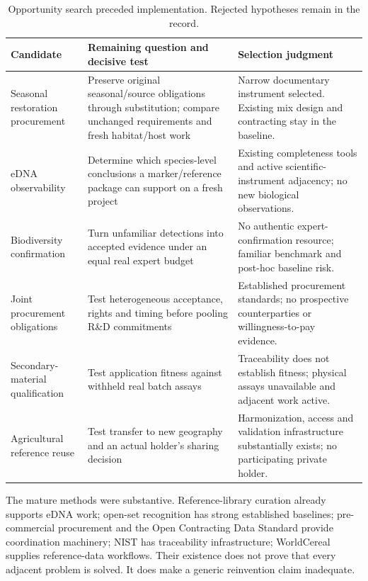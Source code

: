 \documentclass[11pt]{article}
\begin{document}
\begin{table}[H]
\small
\begin{tabularx}{\textwidth}{@{}p{27mm}Y Y@{}}
\toprule
Candidate & Remaining question and decisive test & Selection judgment\\\midrule
Seasonal restoration procurement & Preserve original seasonal/source obligations through substitution; compare unchanged requirements and fresh habitat/host work & Narrow documentary instrument selected. Existing mix design and contracting stay in the baseline.\\
eDNA observability & Determine which species-level conclusions a marker/reference package can support on a fresh project & Existing completeness tools and active scientific-instrument adjacency; no new biological observations.\\
Biodiversity confirmation & Turn unfamiliar detections into accepted evidence under an equal real expert budget & No authentic expert-confirmation resource; familiar benchmark and post-hoc baseline risk.\\
Joint procurement obligations & Test heterogeneous acceptance, rights and timing before pooling R\&D commitments & Established procurement standards; no prospective counterparties or willingness-to-pay evidence.\\
Secondary-material qualification & Test application fitness against withheld real batch assays & Traceability does not establish fitness; physical assays unavailable and adjacent work active.\\
Agricultural reference reuse & Test transfer to new geography and an actual holder's sharing decision & Harmonization, access and validation infrastructure substantially exists; no participating private holder.\\
\bottomrule
\end{tabularx}
\caption{Opportunity search preceded implementation. Rejected hypotheses remain in the record.}
\label{tab:candidates}
\end{table}

The mature methods were substantive. Reference-library curation already supports eDNA work; open-set recognition has strong established baselines; pre-commercial procurement and the Open Contracting Data Standard provide coordination machinery; NIST has traceability infrastructure; WorldCereal supplies reference-data workflows. Their existence does not prove that every adjacent problem is solved. It does make a generic reinvention claim inadequate.\cite{edna,openinsect,pcp,ocds,nist,worldcereal}
\end{document}
